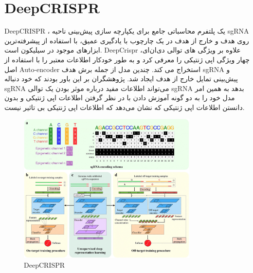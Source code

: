 \documentclass[12pt,a4paper,BCOR=.7cm,headsepline,bibliography=totoc]{report}
\begin{document}
\section{DeepCRISPR}
DeepCRISPR ، 
یک پلتفرم محاسباتی جامع برای یکپارچه سازی پیش‌بینی ناحیه‌ sgRNA روی هدف و خارج از هدف در یک چارچوب با یادگیری عمیق، با استفاده از پیشرفته‌ترین ابزارهای موجود در سیلیکون است. DeepCrispr \cite{DeepCRISPR} علاوه بر ویژگی های توالی دی‌ان‌ای، چهار ویژگی اپی ژنتیکی را معرفی کرد و به طور خودکار اطلاعات معتبر را با استفاده از اصل Auto-encoder استخراج می کند. چندین مدل از جمله برش هدف sgRNA و پیش‌بینی تمایل خارج از هدف ایجاد شد. پژوهشگران بر این باور بودند که خود دنباله sgRNA می‌تواند اطلاعات مفید درباره موثر بودن یک توالی sgRNA بدهد به همین امر مدل خود را به دو گونه آموزش دادن با در نظر گرفتن اطلاعات اپی ژنتیکی و بدون دانستن اطلاعات اپی ژنتیکی که نشان می‌دهد که اطلاعات اپی ژنتیکی بی تاثیر نیست. 
\begin{figure}[H]
\centering
\includegraphics[width=9cm, ]{pictures/DeepCRISPR.jpg}
\caption{
DeepCRISPR~\cite{DeepCRISPR}
}\label{wrap-fig:4}
\end{figure}
\end{document}
